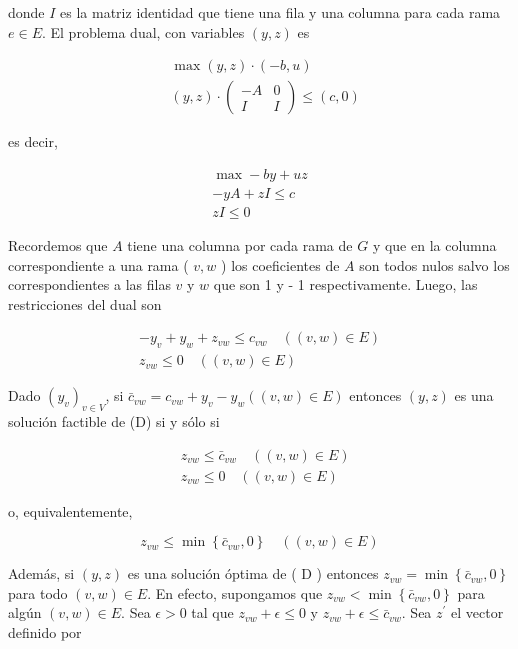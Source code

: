 \documentclass[10pt]{article}
\begin{document}
donde $I$ es la matriz identidad que tiene una fila y una columna para cada rama $e \in E$. El problema dual, con variables $(y, z)$ es


\begin{align*}
& \max (y, z) \cdot(-b, u) \\
& (y, z) \cdot\left(\begin{array}{cc}
-A & 0 \\
I & I
\end{array}\right) \leq(c, 0) \tag{D}
\end{align*}


es decir,

$$
\begin{gathered}
\max -b y+u z \\
-y A+z I \leq c \\
z I \leq 0
\end{gathered}
$$

Recordemos que $A$ tiene una columna por cada rama de $G$ y que en la columna correspondiente a una rama ( $v, w$ ) los coeficientes de $A$ son todos nulos salvo los correspondientes a las filas $v$ y $w$ que son 1 y - 1 respectivamente. Luego, las restricciones del dual son

$$
\begin{gathered}
-y_{v}+y_{w}+z_{v w} \leq c_{v w} \quad((v, w) \in E) \\
z_{v w} \leq 0 \quad((v, w) \in E)
\end{gathered}
$$

Dado $\left(y_{v}\right)_{v \in V}$, si $\bar{c}_{v w}=c_{v w}+y_{v}-y_{w}((v, w) \in E)$ entonces $(y, z)$ es una solución factible de (D) si y sólo si

$$
\begin{aligned}
& z_{v w} \leq \bar{c}_{v w} \quad((v, w) \in E) \\
& z_{v w} \leq 0 \quad((v, w) \in E)
\end{aligned}
$$

o, equivalentemente,

$$
z_{v w} \leq \min \left\{\bar{c}_{v w}, 0\right\} \quad((v, w) \in E)
$$

Además, si $(y, z)$ es una solución óptima de ( D ) entonces $z_{v w}=\min \left\{\bar{c}_{v w}, 0\right\}$ para todo $(v, w) \in E$. En efecto, supongamos que $z_{v w}<\min \left\{\bar{c}_{v w}, 0\right\}$ para algún $(v, w) \in E$. Sea $\epsilon>0$ tal que $z_{v w}+\epsilon \leq 0$ y $z_{v w}+\epsilon \leq \bar{c}_{v w}$. Sea $z^{\prime}$ el vector definido por
\end{document}
